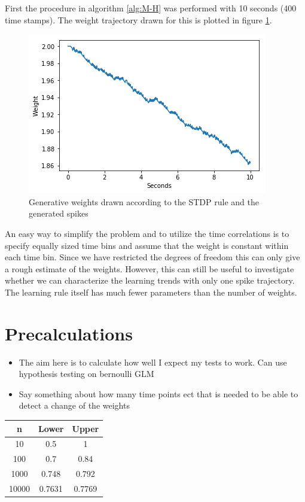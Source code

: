 First the procedure in algorithm \ref{alg:M-H} was performed with 10 seconds (400 time stamps). The weight trajectory drawn for this is plotted in figure \ref{fig:w_STDP}. 


\begin{figure}[hbt!]
\caption{Generative weights drawn according to the STDP rule and the generated spikes}
\label{fig:w_STDP}
    \centering
    \includegraphics[scale=0.8]{fig/LR_underllying.png}
\end{figure}

An easy way to simplify the problem and to utilize the time correlations is to specify equally sized time bins and assume that the weight is constant within each time bin. Since we have restricted the degrees of freedom this can only give a rough estimate of the weights. However, this can still be useful to investigate whether we can characterize the learning trends with only one spike trajectory. The learning rule itself has much fewer parameters than the number of weights. 



\section{Precalculations}
\label{Precalc}

\begin{itemize}
    \item The aim here is to calculate how well I expect my tests to work. Can use hypothesis testing on bernoulli GLM 
    \item Say something about how many time points ect that is needed to be able to detect a change of the weights
\end{itemize}

\begin{table}
\begin{center}
 \begin{tabular}{||c c c ||} 
 \hline
 n & Lower & Upper \\ [0.5ex] 
 \hline\hline
 10 & 0.5 & 1 \\ 
 \hline
 100 & 0.7 & 0.84 \\
 \hline
 1000 & 0.748 & 0.792 \\
 \hline
 10000 & 0.7631 & 0.7769 \\ [1ex] 
 \hline
\end{tabular}
\end{center}
\end{table}

